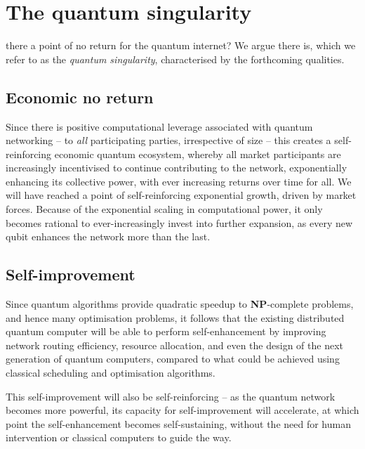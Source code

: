 %
%

\section{The quantum singularity} \label{sec:singularity} 

 there a point of no return for the quantum internet? We argue there is, which we refer to as the \textit{quantum singularity}, characterised by the forthcoming qualities.


%
%

\subsection{Economic no return}

Since there is positive computational leverage associated with quantum networking -- to \textit{all} participating parties, irrespective of size -- this creates a self-reinforcing economic quantum ecosystem, whereby all market participants are increasingly incentivised to continue contributing to the network, exponentially enhancing its collective power, with ever increasing returns over time for all. We will have reached a point of self-reinforcing exponential growth, driven by market forces. Because of the exponential scaling in computational power, it only becomes rational to ever-increasingly invest into further expansion, as every new qubit enhances the network more than the last.

%
%

\subsection{Self-improvement}

Since quantum algorithms provide quadratic speedup to \textbf{NP}-complete problems, and hence many optimisation problems, it follows that the existing distributed quantum computer will be able to perform self-enhancement by improving network routing efficiency, resource allocation, and even the design of the next generation of quantum computers, compared to what could be achieved using classical scheduling and optimisation algorithms.

This self-improvement will also be self-reinforcing -- as the quantum network becomes more powerful, its capacity for self-improvement will accelerate, at which point the self-enhancement becomes self-sustaining, without the need for human intervention or classical computers to guide the way.

